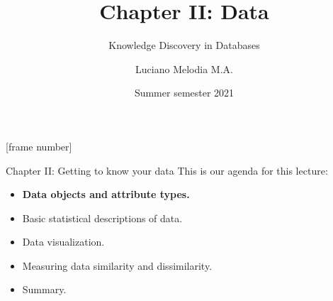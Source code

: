 \documentclass[aspectratio=169,t]{beamer}
\title[KDD]{Chapter II: Data}
\subtitle{Knowledge Discovery in Databases}
\author[L.~Melodia]{Luciano Melodia M.A.}
\institute[Department]{Evolutionary Data Management, Friedrich-Alexander University Erlangen-Nürnberg}
\date{Summer semester 2021}
\begin{document}

  \maketitle

  {
    [frame number]
    \begin{frame}{Chapter II: Getting to know your data}
    This is our agenda for this lecture:
        \begin{itemize}
            \item \textbf{Data objects and attribute types.}
            \item Basic statistical descriptions of data.
            \item Data visualization.
            \item Measuring data similarity and dissimilarity.
            \item Summary.
        \end{itemize}
    \end{frame}
  }
\end{document}

